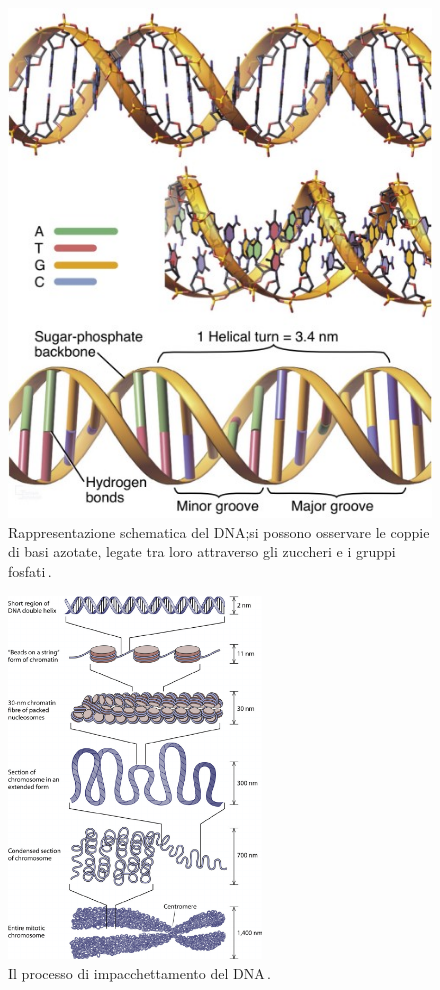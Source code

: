 \begin{figure}[h]
    \centering
    \includegraphics[width=.5\textwidth]{assets/dna.jpg}
    \caption[Rappresentazione schematica del DNA.]{Rappresentazione schematica del DNA;\@ si possono osservare le coppie di basi azotate, legate tra loro attraverso gli zuccheri e i gruppi fosfati\,\cite{pollard2022cell}.}\label{fig:dna}
\end{figure}

\noindent 




\begin{figure}[h]
    \centering
    \includegraphics[width=0.6\textwidth]{assets/dna-packaging.png}
    \caption[Il processo di impacchettamento del DNA.]{Il processo di impacchettamento del DNA\,\cite{jansen2011nucleosome}.}\label{fig:dna-packaging}
\end{figure}



